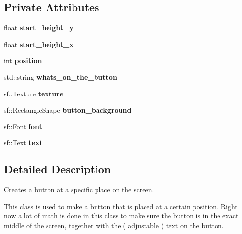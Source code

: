 \subsection*{Private Attributes}
\begin{DoxyCompactItemize}
\item 
\mbox{\label{classbutton_ae89ddc2b4c67d8e06ee986ebf8f64678}} 
float {\bfseries start\+\_\+height\+\_\+y}
\item 
\mbox{\label{classbutton_a235a0266ef30864d5feae7de4a5b62ad}} 
float {\bfseries start\+\_\+height\+\_\+x}
\item 
\mbox{\label{classbutton_a4019a4524e3a3dbfbf600d7d9503fe59}} 
int {\bfseries position}
\item 
\mbox{\label{classbutton_acf5ba8924cc0662391801fd3baba578a}} 
std\+::string {\bfseries whats\+\_\+on\+\_\+the\+\_\+button}
\item 
\mbox{\label{classbutton_a390556bd571d9956e5a39e36c52869df}} 
sf\+::\+Texture {\bfseries texture}
\item 
\mbox{\label{classbutton_a609a129ede8897cb39ab48fb43e306c7}} 
sf\+::\+Rectangle\+Shape {\bfseries button\+\_\+background}
\item 
\mbox{\label{classbutton_a0dd8b8c80e46bcbb18c8e12cf6fd6920}} 
sf\+::\+Font {\bfseries font}
\item 
\mbox{\label{classbutton_aec5f183b411fb2f2759e86bceee44229}} 
sf\+::\+Text {\bfseries text}
\end{DoxyCompactItemize}


\subsection{Detailed Description}
Creates a button at a specific place on the screen. 

This class is used to make a button that is placed at a certain position. Right now a lot of math is done in this class to make sure the button is in the exact middle of the screen, together with the ( adjustable ) text on the button.

